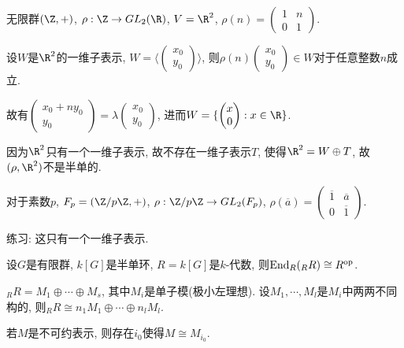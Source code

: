 \begin{example}
    无限群$(\Z,+)$, $\rho:\Z\rightarrow GL_2(\R)$, $V=\R^2$, 
    $\rho(n)=\begin{pmatrix} 1& n\\ 0& 1 \end{pmatrix}$.\par
    \qquad 设$W$是$\R^2$的一维子表示, 
    $W=\langle\begin{pmatrix} x_0\\y_0 \end{pmatrix}\rangle$, 
    则$\rho(n)\begin{pmatrix} x_0\\y_0 \end{pmatrix}\in W$对于任意整数$n$成立.\par
    \qquad 故有$\begin{pmatrix} x_0+ny_0\\y_0 \end{pmatrix}
    =\lambda \begin{pmatrix} x_0\\y_0 \end{pmatrix}$, 
    进而$W=\{\begin{pmatrix} x\\0 \end{pmatrix}:x\in \R\}$.\par
    \qquad 因为$\R^2$只有一个一维子表示, 故不存在一维子表示$T$, 
    使得$\R^2=W\oplus T$, 故$(\rho,\R^2)$不是半单的.
\end{example}

\begin{example}
    对于素数$p$, $F_p=(\Z/p\Z,+)$, $\rho: \Z/p\Z\rightarrow GL_2(F_p)$, 
    $\rho(\overline{a})=\begin{pmatrix} \overline{1} &\overline{a}\\
     0 &\overline{1} \end{pmatrix}$.\par
    练习: 这只有一个一维子表示.
\end{example}

\begin{definition}
    设$G$是有限群, $k[G]$是半单环, $R=k[G]$是$k$-代数, 
    则$\operatorname{End}_R(_RR)\cong R^{\mathrm{op}}$.
\end{definition}

\begin{proposition}
    $_RR=M_1\oplus \cdots \oplus M_s$, 其中$M_i$是单子模(极小左理想). 
    设$M_1,\cdots, M_l$是$M_i$中两两不同构的, 
    则$_RR\cong n_1M_1\oplus \cdots \oplus n_lM_l$.\par
    \qquad 若$M$是不可约表示, 则存在$i_0$使得$M\cong M_{i_0}$.
\end{proposition}


